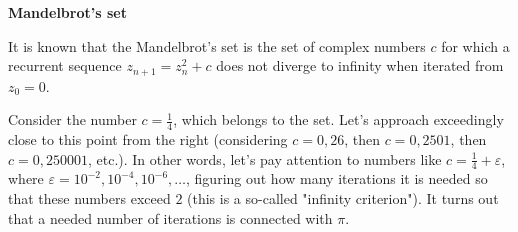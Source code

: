 \documentclass[12pt]{article}
\begin{document}
\begin{titlepage}
\begin{center}
	\LARGE\textbf{Mandelbrot's set}
\end{center}
\large
It is known that the Mandelbrot's set is the set of complex numbers $c$ for which a recurrent sequence $z_{n+1}=z_{n}^{2}+c$ does not diverge to infinity when iterated from $z_{0}=0$.
\begin{flushleft}
	
Consider the number $c=\frac{1}{4}$, which belongs to the set. Let's approach exceedingly close to this point from the right (considering $c=0,\!26$, then $c=0,\!2501$, then $c=0,\!250001$, etc.). In other words, let's pay attention to numbers like $c=\frac{1}{4}+\varepsilon$, where $\varepsilon={10}^{-2}, {10}^{-4}, {10}^{-6},\ldots$, figuring out how many iterations it is needed so that these numbers exceed $2$ (this is a so-called "infinity criterion"). It turns out that a needed number of iterations is connected with $\pi$.

\end{flushleft}
\end{titlepage}
\end{document}
